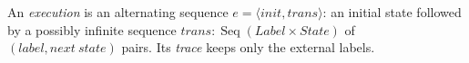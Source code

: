 \begin{definition}[Execution]
  \label{def:exec}
  \leanok
  An \emph{execution} is an alternating sequence $e = \langle init, trans\rangle$: an initial state followed by a possibly infinite sequence $trans : \operatorname{Seq}(Label \times State)$ of $(label, next\ state)$ pairs.
  Its \emph{trace} keeps only the external labels.
\end{definition}
